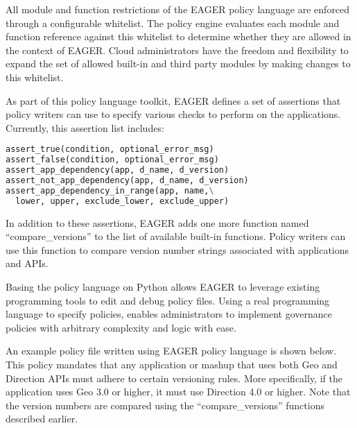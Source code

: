 All module and function restrictions of the EAGER policy language are enforced
through a configurable whitelist. The policy engine evaluates each module and function
reference against this whitelist to determine whether they are allowed in the context of
EAGER. Cloud administrators have the freedom
and flexibility to expand the set of allowed built-in and third party modules by making
changes to this whitelist.

As part of this policy language toolkit, EAGER
defines a set of assertions that policy writers can use to specify various 
checks to perform on the applications. 
Currently, this assertion list includes:

\vspace{0.05in}
{\footnotesize 
\begin{lstlisting}[language=Python, frame=single]
assert_true(condition, optional_error_msg)
assert_false(condition, optional_error_msg)
assert_app_dependency(app, d_name, d_version)
assert_not_app_dependency(app, d_name, d_version)
assert_app_dependency_in_range(app, name,\
  lower, upper, exclude_lower, exclude_upper)
\end{lstlisting}
}


In addition to these assertions, EAGER adds one more function
named ``compare\_versions'' to the list of available built-in functions. Policy
writers can use this function to compare version number strings associated with
applications and APIs.

Basing the policy language on Python allows EAGER to leverage
existing programming tools to edit and debug policy files. Using a real programming 
language to specify policies, enables administrators to implement governance policies with
arbitrary complexity and logic with ease. 

An example policy file written using EAGER
policy language is shown below. 
This policy mandates that any application or mashup
that uses both Geo and Direction APIs must adhere to certain versioning 
rules. More specifically, if the application uses Geo 3.0 or higher, it must use
Direction 4.0 or higher. Note that the version numbers are compared using the
``compare\_versions'' functions described earlier.

